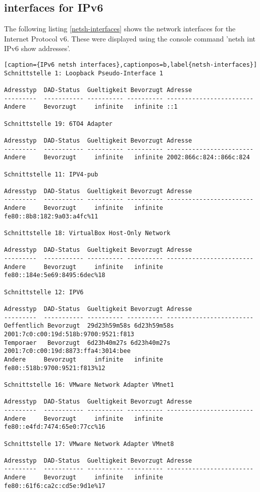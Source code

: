 \subsection{interfaces for IPv6}
The following listing \ref{netsh-interfaces} shows the network interfaces for the Internet Protocol v6. These were displayed using the console command 'netsh int IPv6 show addresses'.
\\
\begin{lstlisting}[caption={IPv6 netsh interfaces},captionpos=b,label{netsh-interfaces}]
Schnittstelle 1: Loopback Pseudo-Interface 1

Adresstyp  DAD-Status  Gueltigkeit Bevorzugt Adresse
---------  ----------- ---------- ---------- ------------------------
Andere     Bevorzugt     infinite   infinite ::1

Schnittstelle 19: 6TO4 Adapter

Adresstyp  DAD-Status  Gueltigkeit Bevorzugt Adresse
---------  ----------- ---------- ---------- ------------------------
Andere     Bevorzugt     infinite   infinite 2002:866c:824::866c:824

Schnittstelle 11: IPV4-pub

Adresstyp  DAD-Status  Gueltigkeit Bevorzugt Adresse
---------  ----------- ---------- ---------- ------------------------
Andere     Bevorzugt     infinite   infinite fe80::8b8:182:9a03:a4fc%11

Schnittstelle 18: VirtualBox Host-Only Network

Adresstyp  DAD-Status  Gueltigkeit Bevorzugt Adresse
---------  ----------- ---------- ---------- ------------------------
Andere     Bevorzugt     infinite   infinite fe80::184e:5e69:8495:6dec%18

Schnittstelle 12: IPV6

Adresstyp  DAD-Status  Gueltigkeit Bevorzugt Adresse
---------  ----------- ---------- ---------- ------------------------
Oeffentlich Bevorzugt  29d23h59m58s 6d23h59m58s 2001:7c0:c00:19d:518b:9700:9521:f813
Temporaer   Bevorzugt  6d23h40m27s 6d23h40m27s 2001:7c0:c00:19d:8873:ffa4:3014:bee
Andere     Bevorzugt     infinite   infinite fe80::518b:9700:9521:f813%12

Schnittstelle 16: VMware Network Adapter VMnet1

Adresstyp  DAD-Status  Gueltigkeit Bevorzugt Adresse
---------  ----------- ---------- ---------- ------------------------
Andere     Bevorzugt     infinite   infinite fe80::e4fd:7474:65e0:77cc%16

Schnittstelle 17: VMware Network Adapter VMnet8

Adresstyp  DAD-Status  Gueltigkeit Bevorzugt Adresse
---------  ----------- ---------- ---------- ------------------------
Andere     Bevorzugt     infinite   infinite fe80::61f6:ca2c:cd5e:9d1e%17
\end{lstlisting}


